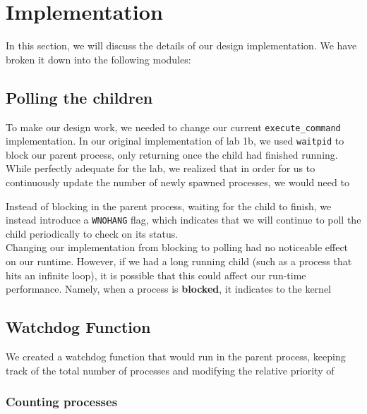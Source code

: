 \documentclass{article}
\begin{document}


\section{Implementation}
In this section, we will discuss the details of our design implementation. We
have broken it down into the following modules:
\subsection{Polling the children}
To make our design work, we needed to change our current \verb+execute_command+
implementation. In our original implementation of lab 1b, we used 
\verb+waitpid+ to block our parent process, only returning once the child had
finished running. While perfectly adequate for the lab, we realized that in 
order for us to continuously update the number of newly spawned processes, we
would need to 

Instead of blocking in the parent process, waiting for the
child to finish, we instead introduce a \verb+WNOHANG+ flag, which indicates
that we will continue to poll the child periodically to check on its status. \\
Changing our implementation from blocking to polling had no noticeable effect
on our runtime. However, if we had a long running child (such as a process that
hits an infinite loop), it is possible that this could affect our run-time 
performance. Namely, when a process is \textbf{blocked}, it indicates to the 
kernel 
\subsection{Watchdog Function}
We created a watchdog function that would run in the parent process, keeping
track of the total number of processes and modifying the relative priority of

\subsubsection{Counting processes}
\end{document}
